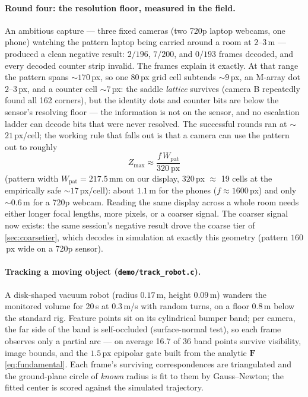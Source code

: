 \documentclass[11pt]{article}
\theoremstyle{definition}
\newcommand{\mat}[1]{\mathbf{#1}}
\newcommand{\F}{\mat{F}}
\newcommand{\code}[1]{\texttt{#1}}
\begin{document}
\paragraph{Round four: the resolution floor, measured in the field.}
An ambitious capture --- three fixed cameras (two 720p laptop webcams,
one phone) watching the pattern laptop being carried around a room at
$2$--$3$\,m --- produced a clean negative result: $2/196$, $7/200$, and
$0/193$ frames decoded, and every decoded counter strip invalid. The
frames explain it exactly. At that range the pattern spans
$\sim$$170$\,px, so one $80$\,px grid cell subtends $\sim$$9$\,px, an
M-array dot $2$--$3$\,px, and a counter cell $\sim$$7$\,px: the saddle
\emph{lattice} survives (camera B repeatedly found all 162 corners),
but the identity dots and counter bits are below the sensor's
resolving floor --- the information is not on the sensor, and no
escalation ladder can decode bits that were never resolved. The
successful rounds ran at $\sim$$21$\,px/cell; the working rule that
falls out is that a camera can use the pattern out to roughly
\begin{equation}
Z_{\max} \approx \frac{f\,W_{\mathrm{pat}}}{320\ \mathrm{px}}
\label{eq:patrange}
\end{equation}
(pattern width $W_{\mathrm{pat}}=217.5$\,mm on our display, $320$\,px
$\approx$ 19 cells at the empirically safe $\sim$$17$\,px/cell): about
$1.1$\,m for the phones ($f\approx1600$\,px) and only $\sim$$0.6$\,m
for a 720p webcam. Reading the same display across a whole room needs
either longer focal lengths, more pixels, or a coarser signal. The
coarser signal now exists: the same session's negative result drove
the coarse tier of \autoref{sec:coarsetier}, which decodes in
simulation at exactly this geometry (pattern $160$\,px wide on a 720p
sensor).

\paragraph{Tracking a moving object (\code{demo/track\_robot.c}).} A
disk-shaped vacuum robot (radius $0.17$\,m, height $0.09$\,m) wanders the
monitored volume for 20\,s at $0.3$\,m/s with random turns, on a floor
$0.8$\,m below the standard rig. Feature points sit on its cylindrical
bumper band; per camera, the far side of the band is self-occluded
(surface-normal test), so each frame observes only a partial arc ---
on average 16.7 of 36 band points survive visibility, image bounds, and
the $1.5$\,px epipolar gate built from the analytic $\F$
\eqref{eq:fundamental}. Each frame's surviving correspondences are
triangulated and the ground-plane circle of \emph{known} radius is fit to
them by Gauss--Newton; the fitted center is scored against the simulated
trajectory.
\end{document}
